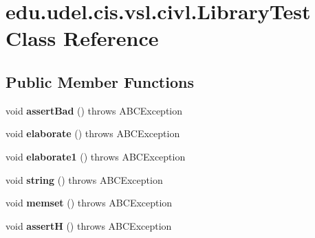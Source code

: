 \hypertarget{classedu_1_1udel_1_1cis_1_1vsl_1_1civl_1_1LibraryTest}{}\section{edu.\+udel.\+cis.\+vsl.\+civl.\+Library\+Test Class Reference}
\label{classedu_1_1udel_1_1cis_1_1vsl_1_1civl_1_1LibraryTest}
\subsection*{Public Member Functions}
\begin{DoxyCompactItemize}
\item 
\hypertarget{classedu_1_1udel_1_1cis_1_1vsl_1_1civl_1_1LibraryTest_aa48aa93fa088a1f0b5ad748fdbcade85}{}void {\bfseries assert\+Bad} ()  throws A\+B\+C\+Exception \label{classedu_1_1udel_1_1cis_1_1vsl_1_1civl_1_1LibraryTest_aa48aa93fa088a1f0b5ad748fdbcade85}

\item 
\hypertarget{classedu_1_1udel_1_1cis_1_1vsl_1_1civl_1_1LibraryTest_a70a8df47b18bdef4b3b8c544d8ede01c}{}void {\bfseries elaborate} ()  throws A\+B\+C\+Exception \label{classedu_1_1udel_1_1cis_1_1vsl_1_1civl_1_1LibraryTest_a70a8df47b18bdef4b3b8c544d8ede01c}

\item 
\hypertarget{classedu_1_1udel_1_1cis_1_1vsl_1_1civl_1_1LibraryTest_a6bb6cfce4016197b262d67d268de07da}{}void {\bfseries elaborate1} ()  throws A\+B\+C\+Exception \label{classedu_1_1udel_1_1cis_1_1vsl_1_1civl_1_1LibraryTest_a6bb6cfce4016197b262d67d268de07da}

\item 
\hypertarget{classedu_1_1udel_1_1cis_1_1vsl_1_1civl_1_1LibraryTest_a71923f9442bad1d5f7344c323a17f1ef}{}void {\bfseries string} ()  throws A\+B\+C\+Exception \label{classedu_1_1udel_1_1cis_1_1vsl_1_1civl_1_1LibraryTest_a71923f9442bad1d5f7344c323a17f1ef}

\item 
\hypertarget{classedu_1_1udel_1_1cis_1_1vsl_1_1civl_1_1LibraryTest_a9a0ff142dab9a0c46a1e33309650cf9d}{}void {\bfseries memset} ()  throws A\+B\+C\+Exception \label{classedu_1_1udel_1_1cis_1_1vsl_1_1civl_1_1LibraryTest_a9a0ff142dab9a0c46a1e33309650cf9d}

\item 
\hypertarget{classedu_1_1udel_1_1cis_1_1vsl_1_1civl_1_1LibraryTest_a127eebff8ce3004931a572c7682868d9}{}void {\bfseries assert\+H} ()  throws A\+B\+C\+Exception \label{classedu_1_1udel_1_1cis_1_1vsl_1_1civl_1_1LibraryTest_a127eebff8ce3004931a572c7682868d9}


\end{DoxyCompactItemize}
